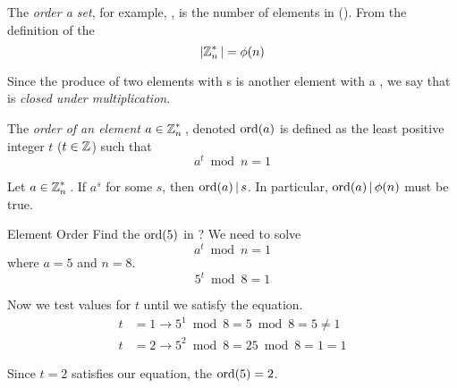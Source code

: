 \begin{definition}\label{def:Set_Order}
  The \emph{order a set}, for example, \TextMultiplicativeGroupN{}, is the number of elements in \TextMultiplicativeGroupN{} (\TextSetOrder{\MultiplicativeGroupN{}}).
  From the definition of the 
  \begin{equation}\label{eq:Set_Order_Euler_Phi_Function}
    \lvert \operatorname{\mathbb{Z}}_{n}^{*}{} \rvert = \phi(n)
  \end{equation}

  \begin{remark}\label{rmk:Set_Order_Closed_Multiplication}
    Since the produce of two elements with s is another element with a , we say that \TextSetOrder{\MultiplicativeGroupN{}} is \emph{closed under multiplication}.
  \end{remark}
\end{definition}

\begin{definition}\label{def:Element_Order}
  The \emph{order of an element} $a \in \operatorname{\mathbb{Z}}_{n}^{*}{}$, denoted $\operatorname{\operatorname{ord}}(a)$ is defined as the least positive integer $t$ ($t \in \operatorname{\mathbb{Z}}$) such that
  \begin{equation}\label{eq:Element_Order}
    a^{t} \bmod n = 1
  \end{equation}
\end{definition}

\begin{lemma}\label{lemma:Element_Order}
  Let $a \in \operatorname{\mathbb{Z}}_{n}^{*}{}$.
  If $a^{s}$ for some $s$, then $\operatorname{\operatorname{ord}}(a) \operatorname{\vert} s$.
  In particular, $\operatorname{\operatorname{ord}}(a) \operatorname{\vert} \phi(n)$ must be true.
\end{lemma}

\begin{example}{Element Order}
  Find the $\operatorname{\operatorname{ord}}(5)$ in ?
  \tcblower{}
  We need to solve
  \begin{equation*}
    a^{t} \bmod n = 1
  \end{equation*}
  where $a = 5$ and $n = 8$.
  \begin{equation*}
    5^{t} \bmod 8 = 1
  \end{equation*}

  Now we test values for $t$ until we satisfy the equation.
  \begin{align*}
    t &= 1 \rightarrow 5^{1} \bmod 8 = 5 \bmod 8 = 5 \neq 1 \\
    t &= 2 \rightarrow 5^{2} \bmod 8 = 25 \bmod 8 = 1 = 1
  \end{align*}

  Since $t=2$ satisfies our equation, the $\operatorname{\operatorname{ord}}(5) = 2$.
\end{example}

